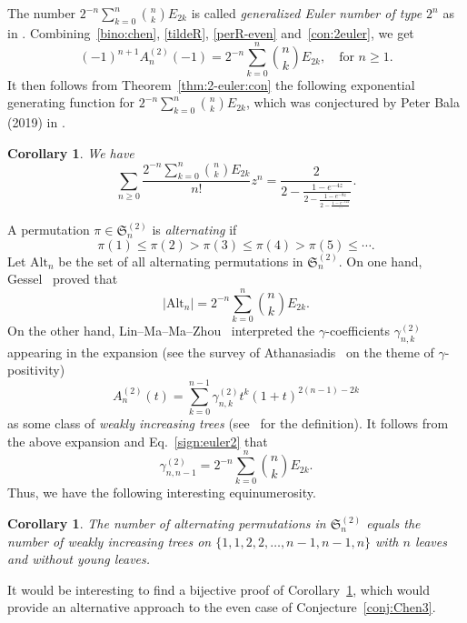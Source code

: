 \documentclass[11pt,reqno]{amsart}
\numberwithin{equation}{section}
\theoremstyle{plain}
\newtheorem{corollary}[theorem]{Corollary}
\theoremstyle{definition}
\renewcommand{\S}{\mathfrak{S}}
\begin{document}
The number $2^{-n}\sum_{k=0}^n\binom{n}{k}E_{2k}$ is called {\em generalized Euler number of type $2^n$} as in \cite[A005799]{oeis}. Combining~\eqref{bino:chen}, \eqref{tildeR}, \eqref{perR-even} and~\eqref{con:2euler}, we get
\begin{equation}\label{sign:euler2}
(-1)^{n+1}A_n^{(2)}(-1)=2^{-n}\sum_{k=0}^n\binom{n}{k}E_{2k},\quad\text{for $n\geq1$}.
\end{equation}
It then follows from Theorem~\ref{thm:2-euler:con} the following exponential generating function for $2^{-n}\sum_{k=0}^n\binom{n}{k}E_{2k}$, which was conjectured by Peter Bala (2019) in \cite[A005799]{oeis}.

\begin{corollary} We have
\begin{equation*}
\sum_{n\geq0}\frac{2^{-n}\sum_{k=0}^n\binom{n}{k}E_{2k}}{n!}z^n=\frac{2}{2-\displaystyle\frac{1-e^{-4z}}{2-\displaystyle\frac{1-e^{-8z}}{2-\displaystyle\frac{1-e^{-12z}}{\cdots}}}}.
\end{equation*}
\end{corollary}

A permutation $\pi\in\S_n^{(2)}$ is {\em alternating} if
$$
\pi(1)\leq \pi(2)>\pi(3)\leq \pi(4)>\pi(5)\leq \cdots.
$$
Let $\mathrm{Alt}_n$ be the set of all alternating permutations in $\S_n^{(2)}$. On one hand, Gessel~\cite[Eq.~(6)]{Ges} proved that
$$
|\mathrm{Alt}_n|=2^{-n}\sum_{k=0}^n\binom{n}{k}E_{2k}.
$$
On the other hand, Lin--Ma--Ma--Zhou~\cite[Corollary~2.15]{LMMZ} interpreted the $\gamma$-coefficients $\gamma_{n,k}^{(2)}$ appearing in the expansion (see the survey of Athanasiadis~\cite{Ath} on the theme of $\gamma$-positivity)
\begin{equation}\label{gamma:2}
A_n^{(2)}(t)=\sum_{k=0}^{n-1}\gamma_{n,k}^{(2)}t^k(1+t)^{2(n-1)-2k}
\end{equation}
as some class of {\em weakly increasing trees} (see~\cite{LMMZ} for the definition). It follows from the above expansion and Eq.~\eqref{sign:euler2} that
$$
\gamma_{n,n-1}^{(2)}=2^{-n}\sum_{k=0}^n\binom{n}{k}E_{2k}.
$$
Thus, we have the following interesting equinumerosity.

\begin{corollary}\label{cor:trees}
The number of alternating permutations in $\S_n^{(2)}$ equals the number of weakly increasing trees on $\{1,1,2,2,\ldots,n-1,n-1,n\}$ with $n$ leaves and without young leaves.
\end{corollary}

It would be interesting to find a bijective proof of Corollary~\ref{cor:trees}, which would provide an alternative approach to the even case of Conjecture~\ref{conj:Chen3}.
\end{document}

